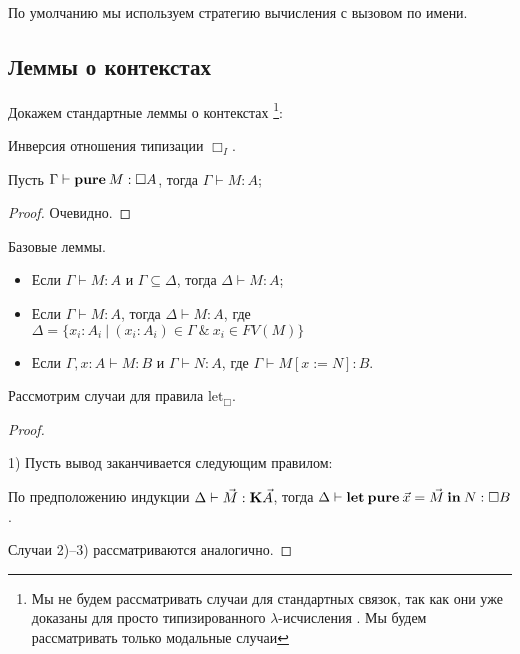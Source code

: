 По умолчанию мы используем стратегию вычисления с вызовом по имени.

\subsection{Леммы о контекстах}

Докажем стандартные леммы о контекстах \footnote{Мы не будем рассматривать случаи для стандартных связок, так как они уже доказаны для просто типизированного $\lambda$-исчисления \cite{Neder} \cite{Morten}. Мы будем рассматривать только модальные случаи}:

\begin{lemma} Инверсия отношения типизации ${\Box}_I$.

Пусть $\Gamma \vdash {\bf pure \:} M : \Box A$, тогда $\Gamma \vdash M : A$;
\end{lemma}

\begin{proof}
Очевидно.
\end{proof}

\begin{lemma} Базовые леммы.

\begin{itemize}
\item Если $\Gamma \vdash M : A$ и $\Gamma \subseteq \Delta$, тогда $\Delta \vdash M : A$;
\item Если $\Gamma \vdash M : A$, тогда $\Delta \vdash M : A$, где $\Delta = \{ x_i : A_i \: | \: (x_i : A_i) \in \Gamma \: \& \: x_i \in FV(M) \}$
\item Если $\Gamma, x : A \vdash M : B$ и $\Gamma \vdash N : A$, где $\Gamma \vdash M [x := N] : B$.
\end{itemize}
\end{lemma}

Рассмотрим случаи для правила $\text{let}_{\Box}$.

\begin{proof}
$ $

1) Пусть вывод заканчивается следующим правилом:

\begin{prooftree}
\end{prooftree}

По предположению индукции $\Delta \vdash \vec{M} : {\bf K} \vec{A}$, тогда $\Delta \vdash {\bf let \: pure \:} \vec{x} = \vec{M} {\: \bf in \: } N : \Box B$.

\vspace{\baselineskip}

Случаи 2)--3) рассматриваются аналогично.

\end{proof}

